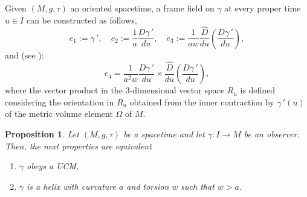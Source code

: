 \documentclass[11pt]{book}
\newtheorem{pro}[defi]{Proposition}
\begin{document}
Given $(M,g,\tau)$ an oriented spacetime, a frame field on $\gamma$ at every proper time $u\in I$ can be constructed as follows, 
\[
e_1:=\gamma{\,'}, \quad e_2:=\dfrac{1}{a}\dfrac{D\gamma{\,'}}{du}, \quad e_3:=\dfrac{1}{aw}\dfrac{\widehat{D}}{du}\left(\dfrac{D\gamma{\,'}}{du}\right), 
\]
and (see \cite{UCM}):
\[
e_4=\dfrac{1}{a^2w}\dfrac{D\gamma{\,'}}{du}\times \dfrac{\widehat{D}}{du}\left(\dfrac{D\gamma{\,'}}{du}\right),
\]
where the vector product in the $3$-dimensional vector space $R_u$ is defined considering the orientation in $R_u$ obtained from the inner contraction by $\gamma{\,'}(u)$ of the metric volume element $\Omega$ of $M$.
\begin{pro}
	Let $(M,g,\tau)$ be a spacetime and let $\gamma:I\to M$ be an observer. Then, the next properties are equivalent
	\begin{enumerate}
		\item[(1)] $\gamma$ obeys a UCM,
		\item[(2)]$\gamma$ is a helix with curvature $a$ and torsion $w$ such that $w>a$.
	\end{enumerate}
\end{pro}
\end{document}
